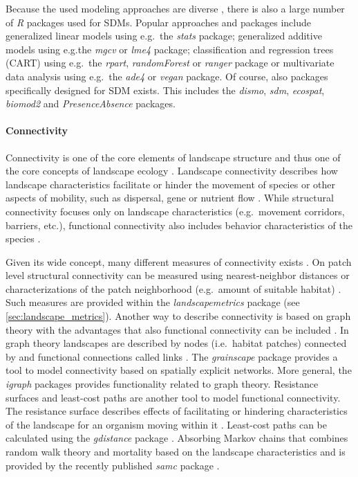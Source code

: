 \documentclass[smallextended]{svjour3}       %
\begin{document}
Because the used modeling approaches are diverse
\cite{Hooten2011,Kerr2011,Fletcher2019}, there is also a large number of
\emph{R} packages used for SDMs. Popular approaches and packages include
generalized linear models using e.g.~the \emph{stats} package;
generalized additive models using e.g.the \emph{mgcv} or \emph{lme4}
package; classification and regression trees (CART) using e.g.~the
\emph{rpart}, \emph{randomForest} or \emph{ranger} package or
multivariate data analysis using e.g.~the \emph{ade4} or \emph{vegan}
package. Of course, also packages specifically designed for SDM exists.
This includes the \emph{dismo}, \emph{sdm}, \emph{ecospat},
\emph{biomod2} and \emph{PresenceAbsence} packages.

\hypertarget{sec:connectivity}{%
\paragraph{Connectivity}\label{sec:connectivity}}

Connectivity is one of the core elements of landscape structure
\cite{Taylor1993} and thus one of the core concepts of landscape ecology
\cite{With2019}. Landscape connectivity describes how landscape
characteristics facilitate or hinder the movement of species
\cite{Tischendorf2000} or other aspects of mobility, such as dispersal,
gene or nutrient flow \cite{With2019}. While structural connectivity
focuses only on landscape characteristics (e.g.~movement corridors,
barriers, etc.), functional connectivity also includes behavior
characteristics of the species \cite{Tischendorf2000,With2019}.

Given its wide concept, many different measures of connectivity exists
\cite{Kindlmann2008}. On patch level structural connectivity can be
measured using nearest-neighbor distances or characterizations of the
patch neighborhood (e.g.~amount of suitable habitat)
\cite{Kindlmann2008,With2019}. Such measures are provided within the
\emph{landscapemetrics} package (see \ref{sec:landscape_metrics}).
Another way to describe connectivity is based on graph theory with the
advantages that also functional connectivity can be included
\cite{Kindlmann2008}. In graph theory \cite{Laita2011} landscapes are
described by nodes (i.e.~habitat patches) connected by and functional
connections called links \cite{Laita2011}. The \emph{grainscape} package
\cite{Chubaty2020} provides a tool to model connectivity based on
spatially explicit networks. More general, the \emph{igraph} packages
\cite{Csardi2006} provides functionality related to graph theory.
Resistance surfaces and least-cost paths are another tool to model
functional connectivity. The resistance surface describes effects of
facilitating or hindering characteristics of the landscape for an
organism moving within it \cite{Adriaensen2003}. Least-cost paths can be
calculated using the \emph{gdistance} package \cite{vanEtten2017}.
Absorbing Markov chains that combines random walk theory and mortality
based on the landscape characteristics \cite{Fletcher2019a} and is
provided by the recently published \emph{samc} package \cite{Marx2020}.
\end{document}
